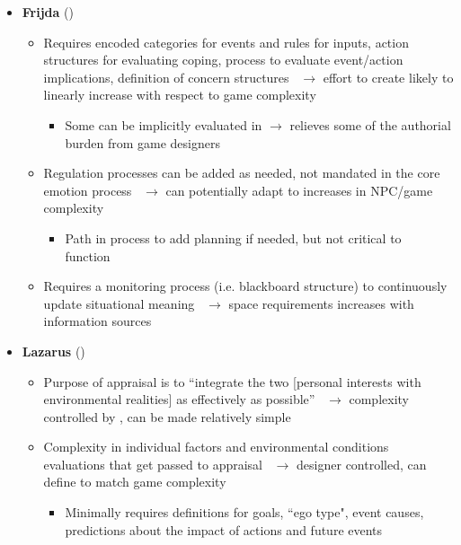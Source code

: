 \begin{itemize}
    \item \textbf{Frijda} (\weak)
    \begin{itemize}
        \item Requires encoded categories for events and rules for inputs,
        action structures for evaluating coping, process to evaluate
        event/action implications, definition of concern
        structures~\citep[p.~457]{frijda1986emotions} $\rightarrow$ effort to
        create likely to linearly increase with respect to game complexity
        \begin{itemize}
            \item Some can be implicitly evaluated in \progname{} $\rightarrow$
            relieves some of the authorial burden from game designers
        \end{itemize}

        \item Regulation processes can be added as needed, not mandated in the
        core emotion process~\citep[p.~454, 456]{frijda1986emotions}
        $\rightarrow$ can potentially adapt to increases in NPC/game complexity
        \begin{itemize}
            \item Path in process to add planning if needed, but not critical to
            function~\citep[p.~462]{frijda1986emotions}
        \end{itemize}

        \item Requires a monitoring process (i.e. blackboard structure) to
        continuously update situational
        meaning~\citep[p.~459]{frijda1986emotions} $\rightarrow$ space
        requirements increases with information sources

    \end{itemize}

    \item \textbf{Lazarus} (\strong)
    \begin{itemize}
        \item Purpose of appraisal is to ``integrate the two [personal
        interests with environmental realities] as effectively as
        possible''~\citep[p.~135]{lazarus1991emotion} $\rightarrow$ complexity
        controlled by \progname{}, can be made relatively simple

        \item Complexity in individual factors and environmental conditions
        evaluations that get passed to
        appraisal~\citep[p.~209--210]{lazarus1991emotion} $\rightarrow$
        designer controlled, can define to match game complexity
        \begin{itemize}
            \item Minimally requires definitions for goals, ``ego type", event
            causes, predictions about the impact of actions and future
            events~\citep[p.~149--150]{lazarus1991emotion}


\end{itemize}
\end{itemize}
\end{itemize}
